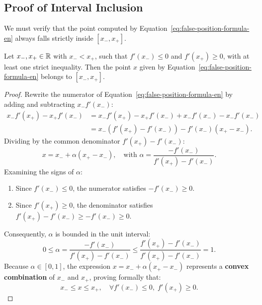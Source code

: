 \subsection{Proof of Interval Inclusion}
We must verify that the point computed by Equation~\eqref{eq:false-position-formula-en} always falls strictly inside $[x_-, x_+]$.

\begin{theorem}
Let $x_-, x_+ \in \mathbb{R}$ with $x_- < x_+$, such that $f'(x_-) \le 0$ and $f'(x_+) \ge 0$, with at least one strict inequality. Then the point $x$ given by Equation~\eqref{eq:false-position-formula-en} belongs to $[x_-, x_+]$.
\end{theorem}

\begin{proof}
Rewrite the numerator of Equation~\eqref{eq:false-position-formula-en} by adding and subtracting $x_- f'(x_-)$:
\begin{align}
    x_- f'(x_+) - x_+ f'(x_-) &= x_- f'(x_+) - x_+ f'(x_-) + x_- f'(x_-) - x_- f'(x_-) \nonumber \\
    &= x_- \left( f'(x_+) - f'(x_-) \right) - f'(x_-) (x_+ - x_-).
\end{align}
Dividing by the common denominator $f'(x_+) - f'(x_-)$:
\begin{equation}
    x = x_- + \alpha (x_+ - x_-), \quad \text{with } \alpha = \frac{-f'(x_-)}{f'(x_+) - f'(x_-)}.
    \label{eq:convex-combination-alpha-en}
\end{equation}
Examining the signs of $\alpha$:
\begin{enumerate}
    \item Since $f'(x_-) \le 0$, the numerator satisfies $-f'(x_-) \ge 0$.
    \item Since $f'(x_+) \ge 0$, the denominator satisfies $f'(x_+) - f'(x_-) \ge -f'(x_-) \ge 0$.
\end{enumerate}
Consequently, $\alpha$ is bounded in the unit interval:
\begin{equation}
    0 \le \alpha = \frac{-f'(x_-)}{f'(x_+) - f'(x_-)} \le \frac{f'(x_+) - f'(x_-)}{f'(x_+) - f'(x_-)} = 1.
\end{equation}
Because $\alpha \in [0, 1]$, the expression $x = x_- + \alpha (x_+ - x_-)$ represents a \textbf{convex combination} of $x_-$ and $x_+$, proving formally that:
\begin{equation}
    x_- \le x \le x_+, \quad \forall f'(x_-) \le 0, \; f'(x_+) \ge 0.
\end{equation}
\end{proof}


